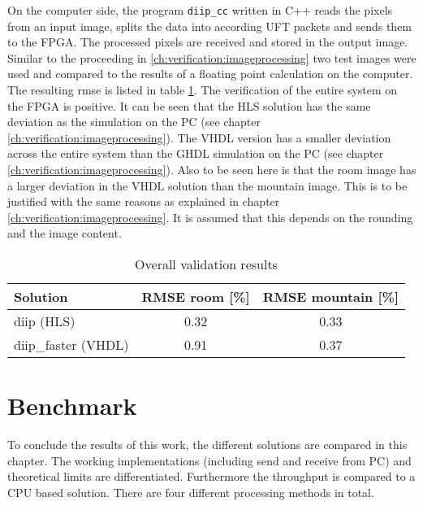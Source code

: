 On the computer side, the program \texttt{diip\_cc} written in C++ reads the
pixels from an input image, splits the data into according UFT packets and sends
them to the FPGA. The processed pixels are received and stored in the output
image. Similar to the proceeding in \ref{ch:verification:imageprocessing} two
test images were used and compared to the results of a floating point
calculation on the computer. The resulting \gls{rmse} is listed in table 
\ref{tab:overallvalidationresults}. The verification of the entire system on
the FPGA is positive. It can be seen that the HLS solution has the same
deviation as the simulation on the PC (see chapter 
\ref{ch:verification:imageprocessing}). The VHDL version has a smaller
deviation across the entire system than the GHDL simulation on the PC (see
chapter \ref{ch:verification:imageprocessing}). Also to be seen here is that
the room image has a larger deviation in the VHDL solution than the
mountain image. This is to be justified with the same reasons as explained in
chapter \ref{ch:verification:imageprocessing}. It is assumed that this depends on the rounding and the image content. 


\begin{table}[tb!] \centering \begin{tabular}{l c c}
        \toprule
        Solution            & RMSE room [\%]    & RMSE mountain [\%]\\
        \midrule
        diip (HLS)          & 0.32             & 0.33 \\
        diip\_faster (VHDL) & 0.91             & 0.37 \\
        \bottomrule
    \end{tabular}
    \caption{Overall validation results}
    \label{tab:overallvalidationresults}
\end{table}


%
%
\section{Benchmark}\label{ch:benchmark}
To conclude the results of this work, the different solutions are compared in
this chapter. The working implementations (including send and receive from PC)
and theoretical limits are differentiated. Furthermore the throughput is
compared to a CPU based solution.
There are four different processing methods in total.


